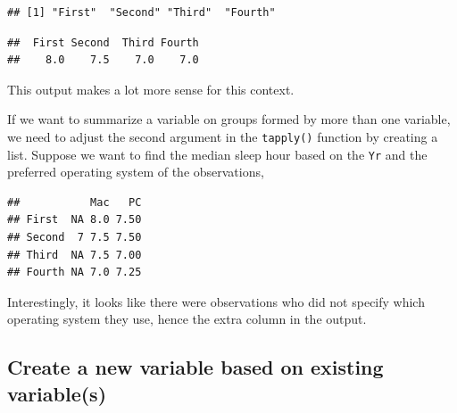 \documentclass[
]{book}
\newenvironment{Shaded}{\begin{snugshade}}{\end{snugshade}}
\newcommand{\AttributeTok}[1]{\textcolor[rgb]{0.13,0.29,0.53}{#1}}
\newcommand{\DocumentationTok}[1]{\textcolor[rgb]{0.56,0.35,0.01}{\textbf{\textit{#1}}}}
\newcommand{\FunctionTok}[1]{\textcolor[rgb]{0.13,0.29,0.53}{\textbf{#1}}}
\newcommand{\NormalTok}[1]{#1}
\newcommand{\SpecialCharTok}[1]{\textcolor[rgb]{0.81,0.36,0.00}{\textbf{#1}}}
\begin{document}
\begin{verbatim}
## [1] "First"  "Second" "Third"  "Fourth"
\end{verbatim}

\begin{Shaded}
\end{Shaded}

\begin{verbatim}
##  First Second  Third Fourth 
##    8.0    7.5    7.0    7.0
\end{verbatim}

This output makes a lot more sense for this context.

If we want to summarize a variable on groups formed by more than one variable, we need to adjust the second argument in the \texttt{tapply()} function by creating a list. Suppose we want to find the median sleep hour based on the \texttt{Yr} and the preferred operating system of the observations,

\begin{Shaded}
\end{Shaded}

\begin{verbatim}
##           Mac   PC
## First  NA 8.0 7.50
## Second  7 7.5 7.50
## Third  NA 7.5 7.00
## Fourth NA 7.0 7.25
\end{verbatim}

Interestingly, it looks like there were observations who did not specify which operating system they use, hence the extra column in the output.

\hypertarget{create-a-new-variable-based-on-existing-variables}{%
\subsection{Create a new variable based on existing variable(s)}\label{create-a-new-variable-based-on-existing-variables}}
\end{document}

